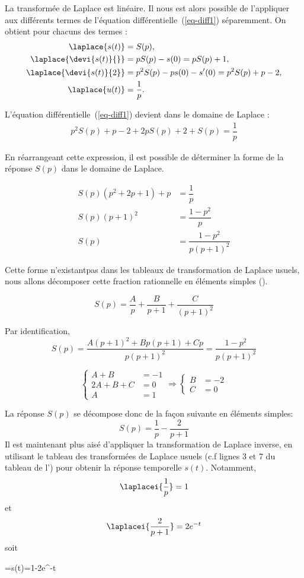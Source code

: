 La transformée de Laplace est linéaire. Il nous est alors possible
de l'appliquer aux différents termes de l'équation différentielle~(\ref{eq-diff1}) séparemment.
On obtient pour chacuns des termes :
\begin{align*}
    \laplace{s(t)} &= S(p), \\
    \laplace{\devi{s(t)}{}} &= pS(p)-s(0) = pS(p) +1, \\
    \laplace{\devi{s(t)}{2}} &= p^2S(p)-ps(0)-s'(0) = p^2S(p) + p -2,\\
    \laplace{u(t)} &= \dfrac{1}{p}.
\end{align*}

L'équation différentielle~(\ref{eq-diff1}) devient dans le domaine de Laplace :
\begin{align*}
p^2S(p)+p-2+2pS(p)+2+S(p)=\dfrac{1}{p} 
\end{align*}

En réarrangeant cette expression, il est possible de déterminer la forme de la réponse 
$S(p)$ dans le domaine de Laplace.

\begin{align*}
    S(p)\left(p^2+2p+1\right)+p&=\dfrac{1}{p} \\
    S(p)\left(p+1\right)^2 &= \dfrac{1-p^2}{p}\\
    S(p)&= \dfrac{1-p^2}{p\left(p+1\right)^2}
\end{align*}

Cette forme \og n'existant\fg pas dans les tableaux de transformation de Laplace usuels, nous allons décomposer cette
fraction rationnelle en éléments simples ().

$$
S(p)=\dfrac{A}{p}+\dfrac{B}{p+1}+\dfrac{C}{(p+1)^2}
$$

Par identification, 
$$
S(p)=\dfrac{A(p+1)^2+Bp(p+1)+Cp}{p(p+1)^2}=\dfrac{1-p^2}{p\left(p+1\right)^2}
$$

$$
\begin{cases}
    A+B&=-1 \\
    2A+B+C&=0 \\
    A&=1   
\end{cases}\Rightarrow
\begin{cases}
    B&=-2\\
    C&=0
\end{cases}
$$

La réponse $S(p)$ se décompose donc de la façon suivante en éléments simples:
$$
S(p)=\dfrac{1}{p}-\dfrac{2}{p+1}
$$
Il est maintenant plus aisé d'appliquer la transformation de Laplace inverse, 
en utilisant le tableau des transformées de Laplace usuels (c.f lignes 3 et 7 du tableau de l') 
pour obtenir la réponse temporelle $s(t)$. Notamment,
$$
\laplacei{\dfrac{1}{p}}=1
$$
et
$$
\laplacei{\dfrac{2}{p+1}}=2e^{-t}
$$
soit 
\begin{bequation}
    =s(t)=1-2e^{-t}
\end{bequation}


